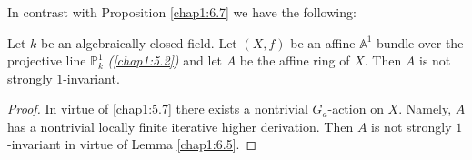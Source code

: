 \subsubsection{}\label{chap1:6.7.3}
In contrast with Proposition \ref{chap1:6.7} we have the following:

\begin{prop*}
Let $k$ be an algebraically closed field. Let $(X,f)$ be an affine
$\mathbb{A}^{1}$-bundle over the projective line $\mathbb{P}^{1}_{k}$
{\em (\cf \ref{chap1:5.2})} and let $A$ be the affine ring of $X$. Then $A$
is not strongly $1$-invariant.
\end{prop*}

\begin{proof}
In virtue of \ref{chap1:5.7} there exists a nontrivial $G_{a}$-action on
$X$. Namely, $A$ has a nontrivial locally finite iterative higher
derivation. Then $A$ is not strongly $1$-invariant in virtue of Lemma
\ref{chap1:6.5}.
\end{proof}

